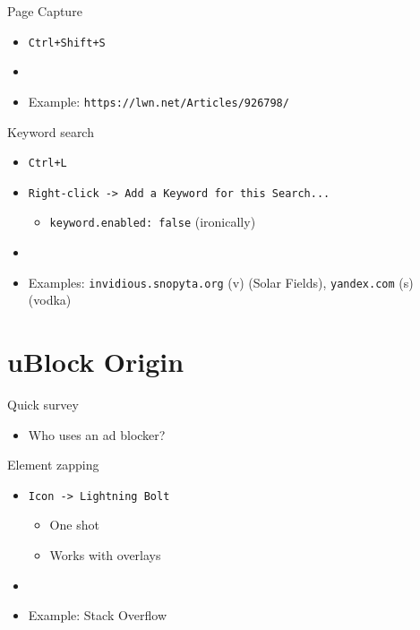 \documentclass{beamer}
\begin{document}
\begin{frame}{Page Capture}
\begin{itemize}
	\item \texttt{Ctrl+Shift+S}
	\item[]
	\item \small Example: \texttt{https://lwn.net/Articles/926798/}
\end{itemize}
\end{frame}

\begin{frame}{Keyword search}
\begin{itemize}
	\item \texttt{Ctrl+L}
	\item \texttt{Right-click -> Add a Keyword for this Search...}
	\begin{itemize}
		\item \texttt{keyword.enabled: false} (ironically)
	\end{itemize}
	\item[]
	\item \small Examples: \texttt{invidious.snopyta.org} (v) (Solar Fields), \texttt{yandex.com} (s) (vodka)
\end{itemize}
\end{frame}

\section{uBlock Origin}

\begin{frame}{Quick survey}
\begin{itemize}
	\item Who uses an ad blocker?
\end{itemize}
\end{frame}

\begin{frame}{Element zapping}
\begin{itemize}
	\item \texttt{Icon -> Lightning Bolt}
	\begin{itemize}
		\item One shot
		\item Works with overlays
	\end{itemize}
	\item[]
	\item \small Example: Stack Overflow
\end{itemize}
\end{frame}
\end{document}
